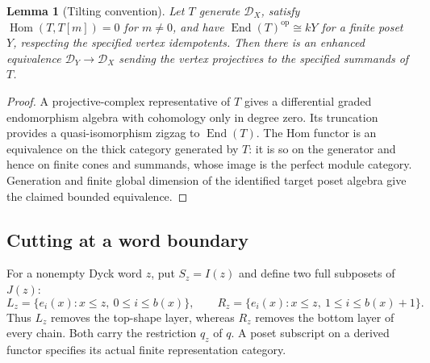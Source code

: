 \documentclass[11pt]{article}
\newtheorem{lemma}[theorem]{Lemma}
\theoremstyle{definition}
\newcommand{\End}{\operatorname{End}}
\begin{document}
\begin{lemma}[Tilting convention]\label{lem:tilting-principle}
Let $T$ generate $\mathcal D_X$, satisfy
$\operatorname{Hom}(T,T[m])=0$ for $m\ne0$, and have
$\operatorname{End}(T)^{\mathrm{op}}\cong kY$ for a finite poset $Y$,
respecting the specified vertex idempotents.
Then there is an enhanced equivalence $\mathcal D_Y\to\mathcal D_X$
sending the vertex projectives to the specified summands of $T$.
\end{lemma}
\begin{proof}
A projective-complex representative of $T$ gives a
differential graded endomorphism algebra with cohomology only in
degree zero. Its truncation provides a quasi-isomorphism zigzag to
$\End(T)$. The Hom functor is an equivalence on the thick category
generated by $T$: it is so on the generator and hence on finite
cones and summands, whose image is the perfect module category.
Generation and finite global dimension of the identified target
poset algebra give the claimed bounded equivalence.
\end{proof}


\subsection{Cutting at a word boundary}
For a nonempty Dyck word $z$, put $S_z=I(z)$ and define two full
subposets of $J(z)$:
\[
 L_z=\{e_i(x):x\leq z,\ 0\leq i\leq b(x)\},\qquad
 R_z=\{e_i(x):x\leq z,\ 1\leq i\leq b(x)+1\}.
\]
Thus $L_z$ removes the top-shape layer, whereas $R_z$ removes the
bottom layer of every chain. Both carry the restriction $q_z$ of
$q$. A poset subscript on a derived functor specifies its actual finite
representation category.
\end{document}
